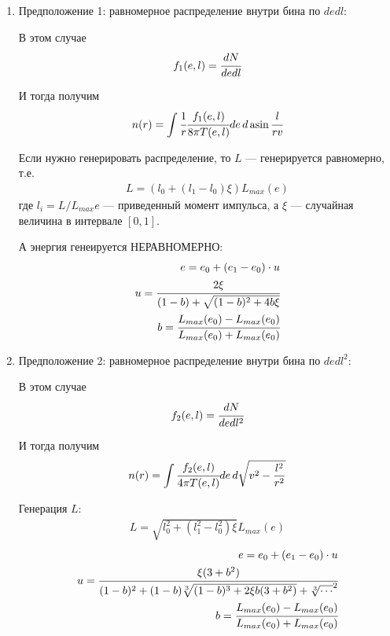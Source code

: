 	 \begin{enumerate}
	 	\item Предположение 1: равномерное распределение внутри бина по $dedl$:
	 	
	 	В этом случае 
	 	\begin{equation}
	 		f_1(e,l) = \cfrac{dN}{de dl}
	 	\end{equation}
	 	
	 	И тогда получим
	 	\begin{equation}
	 		\label{eq:n_r}
	 		n(r) = \int{ \cfrac{1}{r} \cfrac{f_1(e,l) }{8\pi T(e,l)} de \, d\asin{\cfrac{l}{rv}} }
	 	\end{equation}
	 	
	 	Если нужно генерировать распределение, то $L$ --- генерируется равномерно, т.е.
	 	\begin{eqnarray}
			L = (l_0 + (l_1-l_0)\xi)L_{max}(e) 		
	 	\end{eqnarray}
	 	где $l_i = L/L_{max}{e}$ --- приведенный момент импульса, а $\xi$ --- случайная величина в интервале $[0,1]$.
	 	
	 	А энергия генеируется НЕРАВНОМЕРНО:
	 	\begin{eqnarray}
	 		e = e_0 + (e_1-e_0)\cdot u \\
	 		u = \cfrac{2\xi}{(1-b)+\sqrt{(1-b)^2+4b\xi}} \\
	 		b = \cfrac{L_{max}(e_0)-L_{max}(e_0)}{L_{max}(e_0)+L_{max}(e_0)}
	 	\end{eqnarray}
	 	
	 	
	 	
	 	\item Предположение 2: равномерное распределение внутри бина по $dedl^2$:
	 	
	 	В этом случае 
	 	\begin{equation}
	 		f_2(e,l) = \cfrac{dN}{de dl^2}
	 	\end{equation}
	 	
	 	И тогда получим
	 	\begin{equation}
	 		n(r) = \int{\cfrac{f_2(e,l) }{4\pi T(e,l)} de \, d\sqrt{v^2-\frac{l^2}{r^2}} }
	 	\end{equation}
	 	
	 	Генерация $L$:
	 	\begin{eqnarray}
	 		L = \sqrt{l^2_0 + (l^2_1-l^2_0)\xi}L_{max}(e) 		
	 	\end{eqnarray}
	 	\begin{eqnarray}
	 		e = e_0 + (e_1-e_0)\cdot u \\
	 		u = \cfrac{\xi(3 + b^2)}{(1-b)^2+(1-b)\sqrt[3]{(1-b)^3+2\xi b(3 + b^2)} + \sqrt[3]{\cdots}^2} \\
	 		b = \cfrac{L_{max}(e_0)-L_{max}(e_0)}{L_{max}(e_0)+L_{max}(e_0)}
	 	\end{eqnarray}
	 	

\end{enumerate}
